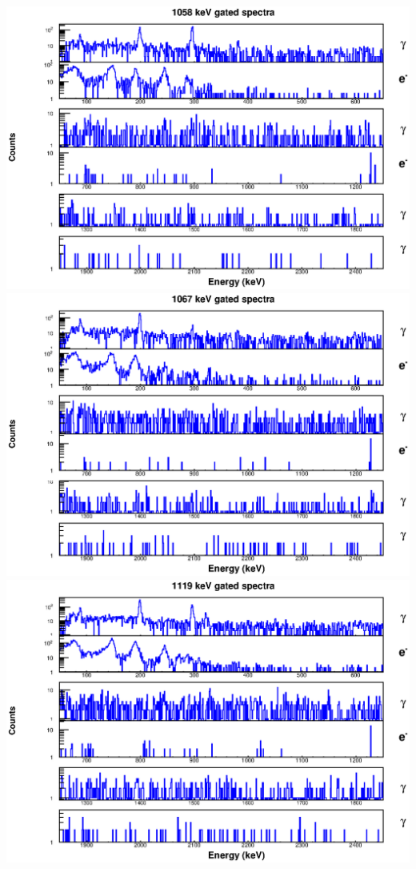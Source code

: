\includegraphics[scale=0.8]{156Gd_Appendix/1058_combined.eps}
\includegraphics[scale=0.8]{156Gd_Appendix/1067_combined.eps}
\includegraphics[scale=0.8]{156Gd_Appendix/1119_combined.eps}
